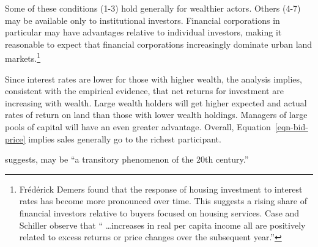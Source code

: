 Some  of these conditions (1-3) hold generally for wealthier actors. Others (4-7) may be available only to institutional investors.  Financial corporations in particular may have advantages relative to individual investors, making it reasonable to expect that financial corporations increasingly dominate urban land 
markets.\footnote{Fr\'ed\'erick Demers \cite{demersModellingForecastingHousing2005} found that the response of housing investment to interest rates has become more pronounced over time. This suggests a rising share of financial investors relative to buyers focused on housing services. Case and Schiller \cite{caseThereBubbleHousing2003} observe that `` \dots increases in real per capita income all are positively related to excess returns or price changes over the subsequent year.''}  

Since interest rates are lower for those with higher wealth, the analysis implies, consistent with the empirical evidence, that net returns for investment are increasing with wealth. Large wealth holders will get higher expected and actual rates of return on land than those with lower wealth holdings. Managers of large pools of capital will have an even greater   advantage. Overall, Equation~\ref{eqn-bid-price} implies  sales generally go to the richest participant.
 



\cite{purdyPropertyOwningDemocracyHome1993} suggests, may be ``a transitory phenomenon of the 20th century.''



